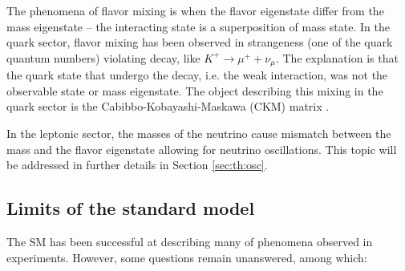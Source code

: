 The phenomena of flavor mixing is when the flavor eigenstate differ from the mass eigenstate -- the interacting state is a superposition of mass state. In the quark sector, flavor mixing has been observed in strangeness (one of the quark quantum numbers) violating decay, like $K^+ \rightarrow \mu^+ + \nu_\mu$. The explanation is that the quark state that undergo the decay, i.e. the weak interaction, was not the observable state or mass eigenstate. The object describing this mixing in the quark sector is the Cabibbo-Kobayashi-Maskawa (CKM) matrix \cite{kobayashi_cp-violation_1973}.

In the leptonic sector, the masses of the neutrino cause mismatch between the mass and the flavor eigenstate allowing for neutrino oscillations. This topic will be addressed in further details in Section \ref{sec:th:osc}.


\subsection{Limits of the standard model}

The SM has been successful at describing many of phenomena observed in experiments. However, some questions remain unanswered, among which:

